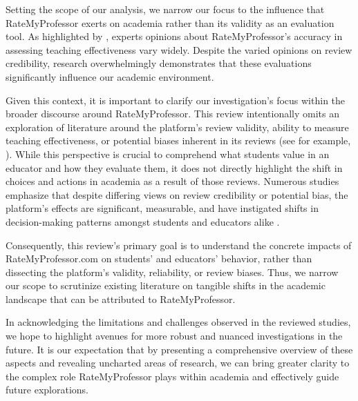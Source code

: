 \documentclass[man, 12pt]{apa7}
\begin{document}
Setting the scope of our analysis, we narrow our focus to the influence that RateMyProfessor exerts on academia rather than its validity as an evaluation tool. As highlighted by \textcite{rosen_correlations_2018}, experts opinions about RateMyProfessor’s accuracy in assessing teaching effectiveness vary widely. Despite the varied opinions on review credibility, research overwhelmingly demonstrates that these evaluations significantly influence our academic environment.

Given this context, it is important to clarify our investigation's focus within the broader discourse around RateMyProfessor. This review intentionally omits an exploration of literature around the platform's review validity, ability to measure teaching effectiveness, or potential biases inherent in its reviews (see for example, \textcite{reid_role_2010,hartman_what_2013, azab_analysing_2016, boring_gender_2017, rosen_correlations_2018, baker_quantcrit_2019, gordon_role_2021}). While this perspective is crucial to comprehend what students value in an educator and how they evaluate them, it does not directly highlight the shift in choices and actions in academia as a result of those reviews. Numerous studies emphasize that despite differing views on review credibility or potential bias, the platform's effects are significant, measurable, and have instigated shifts in decision-making patterns amongst students and educators alike \textcite{johnson_i_2014, boswell_ratemyprofessors_2016, boswell_effects_2020}.

Consequently, this review's primary goal is to understand the concrete impacts of RateMyProfessor.com on students' and educators' behavior, rather than dissecting the platform's validity, reliability, or review biases. Thus, we narrow our scope to scrutinize existing literature on tangible shifts in the academic landscape that can be attributed to RateMyProfessor.

In acknowledging the limitations and challenges observed in the reviewed studies, we hope to highlight avenues for more robust and nuanced investigations in the future. It is our expectation that by presenting a comprehensive overview of these aspects and revealing uncharted areas of research, we can bring greater clarity to the complex role RateMyProfessor plays within academia and effectively guide future explorations.
\end{document}
